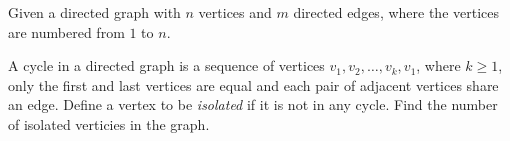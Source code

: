 Given a directed graph with $n$ vertices and $m$ directed edges,
where the vertices are numbered from $1$ to $n$.

A cycle in a directed graph is a sequence of vertices $v_1,v_2,\ldots,v_k,v_1$,
where $k \geq 1$, only the first and last vertices are equal and each pair of adjacent vertices share an edge.
Define a vertex to be \textit{isolated} if it is not in any cycle.
Find the number of isolated verticies in the graph.
